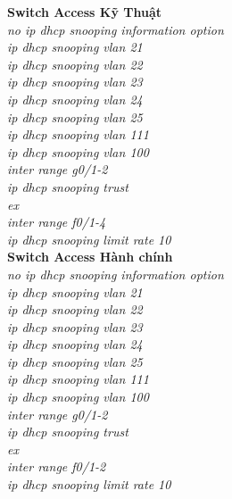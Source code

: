\documentclass[12pt,a4paper]{report}
\begin{document}
\hspace*{1cm}\textbf{Switch Access Kỹ Thuật}\\
\hspace*{2cm}\textit{no ip dhcp snooping information option\\
\hspace*{2cm}ip dhcp snooping vlan 21\\
\hspace*{2cm}ip dhcp snooping vlan 22\\
\hspace*{2cm}ip dhcp snooping vlan 23\\
\hspace*{2cm}ip dhcp snooping vlan 24\\
\hspace*{2cm}ip dhcp snooping vlan 25\\
\hspace*{2cm}ip dhcp snooping vlan 111\\
\hspace*{2cm}ip dhcp snooping vlan 100\\
\hspace*{2cm}inter range g0/1-2\\
\hspace*{2cm}ip dhcp snooping trust\\
\hspace*{2cm}ex\\
\hspace*{2cm}inter range f0/1-4\\
\hspace*{2cm}ip dhcp snooping limit rate 10\\}
\hspace*{1cm}\textbf{Switch Access Hành chính}\\
\hspace*{2cm}\textit{no ip dhcp snooping information option\\
\hspace*{2cm}ip dhcp snooping vlan 21\\
\hspace*{2cm}ip dhcp snooping vlan 22\\
\hspace*{2cm}ip dhcp snooping vlan 23\\
\hspace*{2cm}ip dhcp snooping vlan 24\\
\hspace*{2cm}ip dhcp snooping vlan 25\\
\hspace*{2cm}ip dhcp snooping vlan 111\\
\hspace*{2cm}ip dhcp snooping vlan 100\\
\hspace*{2cm}inter range g0/1-2\\
\hspace*{2cm}ip dhcp snooping trust\\
\hspace*{2cm}ex\\
\hspace*{2cm}inter range f0/1-2\\
\hspace*{2cm}ip dhcp snooping limit rate 10\\}
\end{document}
